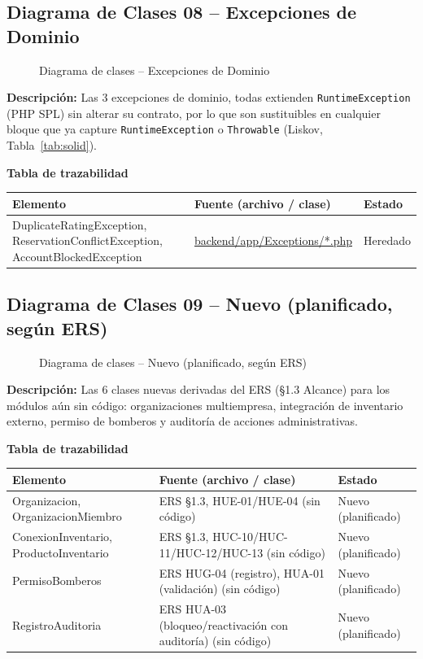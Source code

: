\subsection{Diagrama de Clases 08 -- Excepciones de Dominio}
\label{sssec:clases08}
\begin{figure}[H]
    \centering
    \caption{Diagrama de clases -- Excepciones de Dominio}
    \label{fig:clases08}
\end{figure}
\noindent\textbf{Descripción:} Las 3 excepciones de dominio, todas extienden \texttt{RuntimeException} (PHP SPL) sin alterar su contrato, por lo que son sustituibles en cualquier bloque que ya capture \texttt{RuntimeException} o \texttt{Throwable} (Liskov, Tabla~\ref{tab:solid}).

\bigskip
\noindent\textbf{Tabla de trazabilidad}
\begin{longtable}{|L{5.5cm}|L{7.5cm}|M{2cm}|}
\hline
{} \textbf{Elemento} & \textbf{Fuente (archivo / clase)} & \textbf{Estado} \\ \hline
\endhead
DuplicateRatingException, ReservationConflictException, AccountBlockedException & \url{backend/app/Exceptions/*.php} & Heredado \\ \hline
\end{longtable}
\clearpage

\subsection{Diagrama de Clases 09 -- Nuevo (planificado, según ERS)}
\label{sssec:clases09}
\begin{figure}[H]
    \centering
    \caption{Diagrama de clases -- Nuevo (planificado, según ERS)}
    \label{fig:clases09}
\end{figure}
\noindent\textbf{Descripción:} Las 6 clases nuevas derivadas del ERS (\S1.3 Alcance) para los módulos aún sin código: organizaciones multiempresa, integración de inventario externo, permiso de bomberos y auditoría de acciones administrativas.

\bigskip
\noindent\textbf{Tabla de trazabilidad}
\begin{longtable}{|L{5.5cm}|L{7.5cm}|M{2cm}|}
\hline
{} \textbf{Elemento} & \textbf{Fuente (archivo / clase)} & \textbf{Estado} \\ \hline
\endhead
Organizacion, OrganizacionMiembro & ERS \S1.3, HUE-01/HUE-04 (sin código) & Nuevo (planificado) \\ \hline
ConexionInventario, ProductoInventario & ERS \S1.3, HUC-10/HUC-11/HUC-12/HUC-13 (sin código) & Nuevo (planificado) \\ \hline
PermisoBomberos & ERS HUG-04 (registro), HUA-01 (validación) (sin código) & Nuevo (planificado) \\ \hline
RegistroAuditoria & ERS HUA-03 (bloqueo/reactivación con auditoría) (sin código) & Nuevo (planificado) \\ \hline
\end{longtable}
\clearpage

